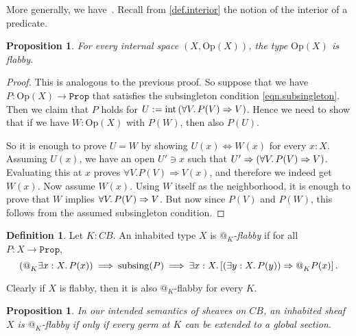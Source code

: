 \documentclass[11pt, oneside, article]{memoir}
\makeatletter
\theoremstyle{plain}
\newtheorem{proposition}[theorem]{Proposition}
\theoremstyle{definition}
\newtheorem{definition}[theorem]{Definition}
\theoremstyle{remark}
\DeclareMathOperator{\interior}{int}
\newcommand{\const}[1]{\mathtt{#1}}
\newcommand{\Set}[1]{\mathrm{#1}}
\newcommand{\subsing}[1]{\mathrm{subsing}(#1)}	%
\newcommand{\Prop}{\const{Prop}}
\newcommand{\Op}{\Set{Op}}
\newcommand{\BaseSpace}{B}
\newcommand{\CB}{C\BaseSpace}
\newcommand{\AtSymbol}{{@}}
\newcommand{\At}[2][]{\AtSymbol^{#1}_{#2}}
\newcommand{\imp}{\Rightarrow}
\makeatother
\begin{document}
More generally, we have~\cite[Lemma~1.2]{moerdijk}. 
Recall from \cref{def.interior} the notion of the interior of a predicate.


\begin{proposition}
	\label{prop:opens_flabby}
	For every internal space $(X,\Op(X))$, the type $\Op(X)$ is flabby.
\end{proposition}

\begin{proof}
This is analogous to the previous proof. So suppose that we have $P : \Op(X) \to \Prop$ that satisfies the subsingleton condition \cref{eqn.subsingleton}. Then we claim that $P$ holds for $U := \interior\left(\forall V \ldotp P(V) \imp V\right)$. Hence we need to show that if we have $W : \Op(X)$ with $P(W)$, then also $P(U)$.

	So it is enough to prove $U = W$ by showing $U(x) \Leftrightarrow W(x)$ for every $x : X$. Assuming $U(x)$, we have an open $U'\ni x$ such that $U' \imp (\forall V \ldotp P(V) \imp V)$. Evaluating this at $x$ proves $\forall V. P(V) \imp V(x)$, and therefore we indeed get $W(x)$. Now assume $W(x)$. Using $W$ itself as the neighborhood, it is enough to prove that $W$ implies $\forall V\ldotp P(V) \imp V$. But now since $P(V)$ and $P(W)$, this follows from the assumed subsingleton condition.
\end{proof}

\begin{definition}\label{def.at_flabby}
	Let $K : \CB$. An inhabited type $X$ is \emph{$\At{K}$-flabby} if for all $P : X \to \Prop$,
	\begin{equation}
		\label{eq.at_flabby}
		\left( \At{K} \exists x : X \ldotp P(x)\right) \: \Longrightarrow \: \subsing{P} \: \Longrightarrow \: \exists x : X \ldotp \left[ (\exists y : X \ldotp P(y)) \imp \At{K} P(x) \right] .
	\end{equation}
\end{definition}

Clearly if $X$ is flabby, then it is also $\At{K}$-flabby for every $K$.

\begin{proposition}
	\label{prop.at_flabby_semantics}
	In our intended semantics of sheaves on $\CB$, an inhabited sheaf $X$ is $\At{K}$-flabby if only if every germ at $K$ can be extended to a global section.
\end{proposition}
\end{document}
